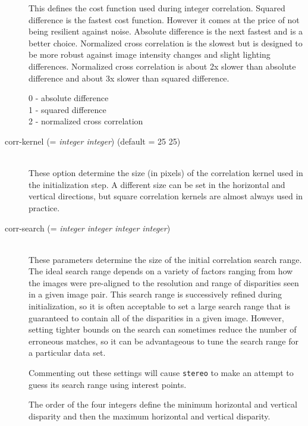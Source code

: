 \begin{description}
  This defines the cost function used during integer
  correlation. Squared difference is the fastest cost
  function. However it comes at the price of not being resilient
  against noise. Absolute difference is the next fastest and is a
  better choice. Normalized cross correlation is the slowest but is
  designed to be more robust against image intensity changes and
  slight lighting differences. Normalized cross correlation is about
  2x slower than absolute difference and about 3x slower than squared
  difference.

  \begin{description}
    \item[0 - absolute difference]
    \item[1 - squared difference]
    \item[2 - normalized cross correlation]
  \end{description}

\item[corr-kernel \textnormal{\small{(= \emph{integer integer})}} (default = 25 25)] \hfill \\
  These option determine the size (in pixels) of the correlation
  kernel used in the initialization step.  A different size can be set
  in the horizontal and vertical directions, but square correlation
  kernels are almost always used in practice.

\item[corr-search \textnormal{\small{(= \emph{integer integer integer integer})}}] \hfill \\
  These parameters determine the size of the initial correlation
  search range.  The ideal search range depends on a variety of
  factors ranging from how the images were pre-aligned to the
  resolution and range of disparities seen in a given image pair.
  This search range is successively refined during initialization, so
  it is often acceptable to set a large search range that is guaranteed
  to contain all of the disparities in a given image.  However,
  setting tighter bounds on the search can sometimes reduce the number
  of erroneous matches, so it can be advantageous to tune the
  search range for a particular data set.

  Commenting out these settings will cause \texttt{stereo} to make an
  attempt to guess its search range using interest points.

  The order of the four integers define the minimum horizontal and
  vertical disparity and then the maximum horizontal and vertical
  disparity.


\end{description}
